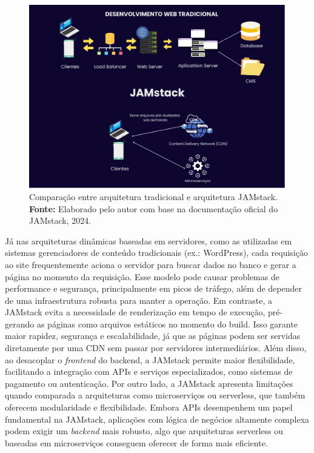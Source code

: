 \begin{figure}[H]
    \centering
    \includegraphics[height=8cm, keepaspectratio]{img/arquitetura/JAM STACK.png}
    \caption{ Comparação entre arquitetura tradicional e arquitetura JAMstack. \\
        \textbf{Fonte:} Elaborado pelo autor com base na documentação oficial do JAMstack, 2024.}
    \label{fig:jamStack Arquitetura}
\end{figure}

Já nas arquiteturas dinâmicas baseadas em servidores, como as utilizadas em sistemas gerenciadores de conteúdo tradicionais (ex.: WordPress), cada requisição ao site frequentemente aciona o servidor para buscar dados no banco e gerar a página no momento da requisição. Esse modelo pode causar problemas de performance e segurança, principalmente em picos de tráfego, além de depender de uma infraestrutura robusta para manter a operação.
Em contraste, a JAMstack evita a necessidade de renderização em tempo de execução, pré-gerando as páginas como arquivos estáticos no momento do build. Isso garante maior rapidez, segurança e escalabilidade, já que as páginas podem ser servidas diretamente por uma CDN sem passar por servidores intermediários. Além disso, ao desacoplar o \textit{frontend} do backend, a JAMstack permite maior flexibilidade, facilitando a integração com APIs e serviços especializados, como sistemas de pagamento ou autenticação.
Por outro lado, a JAMstack apresenta limitações quando comparada a arquiteturas como microserviços ou serverless, que também oferecem modularidade e flexibilidade. Embora APIs desempenhem um papel fundamental na JAMstack, aplicações com lógica de negócios altamente complexa podem exigir um \textit{backend} mais robusto, algo que arquiteturas serverless ou baseadas em microserviços conseguem oferecer de forma mais eficiente.

